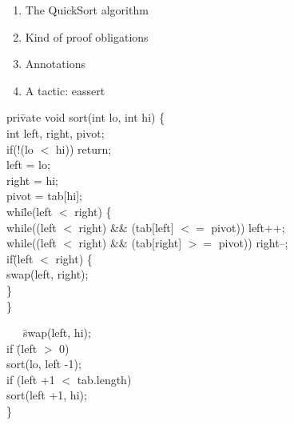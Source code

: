 \begin{enumerate}
\item{The QuickSort algorithm}
\item{Kind of proof obligations}
\item{Annotations}
\item{A tactic: eassert}

\end{enumerate}

\small
\begin{tabbing}
pri\=vate void sort(int lo, int hi) \{\+ \\
  int left, right, pivot;\\
  if(!(lo $<$ hi)) return;\\
  left = lo;\\
  right = hi;\\
  pivot = tab[hi];\\
  
  whi\=le(left $<$ right) \+\{\\
    while((left $<$ right) \&\& (tab[left] $<=$ pivot)) left++;\\
    while((left $<$ right) \&\& (tab[right] $>=$ pivot)) right--;\\
    if\=(left $<$ right)\+ \{\\
      swap(left, right);\-\\
    \}\-\\
  \}
\end{tabbing}
\small
\begin{tabbing}
\ \ \ \=swap(left, hi);\+\\
  if \=(left $>$ 0)\+\\
  sort(lo, left -1);\-\\
  
  if (left +1 $<$ tab.length)\+\\
  sort(left +1, hi);\- \-\\
\}
\end{tabbing}

